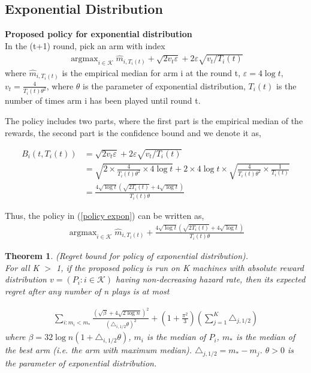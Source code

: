 \documentclass{article}
\DeclareMathOperator*{\argmax}{argmax}
\theoremstyle{plain}
\newtheorem{theo}{Theorem}
\begin{document}
\subsection{Exponential Distribution}

\textbf{Proposed policy for exponential distribution}\\

In the (t+1) round, pick an arm with index 
\begin{align}
   \label{policy expon}
   \argmax_{i \in \mathcal{K}} \hat{m}_{i, T_i(t)} + \sqrt{2v_t \varepsilon} + 2 \varepsilon \sqrt{v_t/T_i(t)}
\end{align}
where $\hat{m}_{i, T_i(t)}$ is the empirical median for arm i at the round t, $\varepsilon = 4 \log t$, $v_t = \frac{4 }{T_i(t) \theta^2}$, where $\theta$ is the parameter of exponential distribution, $T_i(t)$ is the number of times arm i has been played until round t.  

The policy includes two parts, where the first part is the empirical median of the rewards, the second part is the confidence bound and we denote it as,

\begin{align}
B_i(t, T_i(t)) &= \sqrt{2v_t \varepsilon} + 2 \varepsilon \sqrt{v_t/T_i(t)}\\
&= \sqrt{2 \times \frac{4 }{T_i(t) \theta^2} \times 4 \log t} + 2 \times 4 \log t \times \sqrt{\frac{4 }{T_i(t) \theta^2} \times \frac{1}{T_i(t)}}\\
&= \frac{4 \sqrt{\log t} ( \sqrt{ 2T_i(t)} + 4\sqrt{\log t})}{T_i(t) \theta}
\end{align}

Thus, the policy in (\ref{policy expon}) can be written as,
\begin{align}
    \argmax_{i \in \mathcal{K}} \hat{m}_{i, T_i(t)} +  \frac{4 \sqrt{\log t} ( \sqrt{ 2T_i(t)} + 4\sqrt{\log t})}{T_i(t) \theta}
\end{align}

\begin{theo}
(Regret bound for policy of exponential distribution). \\

For all K $>$ 1, if the proposed policy is run on K machines with absolute reward distribution $v = (P_i: i \in \mathcal{K})$ having non-decreasing hazard rate, then its expected regret after any number of n plays is at most 

\begin{align}
    \sum_{i: m_i < m_\ast} \frac{(\sqrt{\beta} + 4\sqrt{2\log n})^2}{ (\triangle_{i, 1/2} \theta)^2} + (1 + \frac{\pi^2}{3}) (\sum_{j=1}^K \triangle_{j, 1/2}) 
\end{align}
where $\beta = 32 \log n (1 + \triangle_{i, 1/2} \theta)$, $m_i$ is the median of $P_i$, $m_\ast$ is the median of the best arm (i.e. the arm with maximum median). $\triangle_{j, 1/2} = m_\ast - m_j$. $\theta > 0$ is the parameter of exponential distribution. 
\end{theo}
\end{document}
